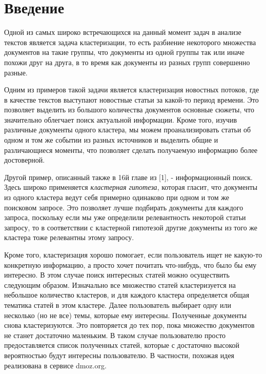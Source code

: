 \section{Введение}

Одной из самых широко встречающихся на данный момент задач в анализе текстов является задача кластеризации, то есть разбиение некоторого множества документов на такие группы, что документы из одной группы так или иначе похожи друг на друга, в то время как документы из разных групп совершенно разные.

Одним из примеров такой задачи является кластеризация новостных потоков, где в качестве текстов выступают новостные статьи за какой-то период времени. Это позволяет выделить из большого количества документов основные сюжеты, что значительно облегчает поиск актуальной информации. Кроме того, изучив различные документы одного кластера, мы можем проанализировать статьи об одном и том же событии из разных источников и выделить общие и различающиеся моменты, что позволяет сделать получаемую информацию более достоверной.

Другой пример, описанный также в 16й главе из [1], - информационный поиск. Здесь широко применяется \emph{кластерная гипотеза}, которая гласит, что документы из одного кластера ведут себя примерно одинаково при одном и том же поисковом запросе. Это позволяет лучше подбирать документы для каждого запроса, поскольку если мы уже определили релевантность некоторой статьи запросу, то в соответствии с кластерной гипотезой другие документы из того же кластера тоже релевантны этому запросу.

Кроме того, кластеризация хорошо помогает, если пользователь ищет не какую-то конкретную информацию, а просто хочет почитать что-нибудь, что было бы ему интересно. В этом случае поиск интересных статей можно осуществить следующим образом. Изначально все множество статей кластеризуется на небольшое количество кластеров, и для каждого кластера определяется общая тематика статей в этом кластере. Далее пользователь выбирает одну или несколько (но не все) темы, которые ему интересны. Полученные документы снова кластеризуются. Это повторяется до тех пор, пока множество документов не станет достаточно маленьким. В таком случае пользователю просто предоставляется список полученных статей, которые с достаточно высокой вероятностью будут интересны пользователю. В частности, похожая идея реализована в сервисе dmoz.org.